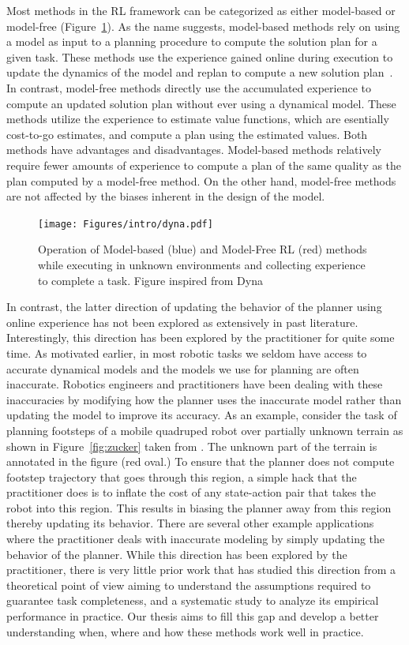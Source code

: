 Most methods in the RL framework can be categorized as either model-based
or model-free (Figure~\ref{fig:dyna}). As the name suggests, model-based methods rely on
using a model as input to a planning procedure to compute the solution
plan for a given task. These methods use the experience gained online
during execution to update the dynamics of the model and replan to
compute a new solution plan~\cite{DBLP:journals/sigart/Sutton91}. In
contrast, model-free methods directly 
use the accumulated experience to compute an updated solution plan
without ever using a dynamical model. These methods utilize the
experience to estimate value functions, which are esentially
cost-to-go estimates, and compute a plan using the estimated
values. Both methods have advantages and disadvantages. Model-based
methods relatively require fewer amounts of experience to compute a
plan of the same quality as the plan computed by a model-free
method. On the other hand, model-free methods are not affected by the biases
inherent in the design of the model.

\begin{figure}[t]
  \centering
  \texttt{[image: Figures/intro/dyna.pdf]}
  \caption{Operation of Model-based (blue) and Model-Free RL (red) methods
    while executing in unknown environments and collecting
    experience to complete a task. Figure inspired from Dyna~\cite{DBLP:journals/sigart/Sutton91}}
  \label{fig:dyna}
\end{figure}

In contrast, the latter direction of updating the behavior of the
planner using online experience has not been explored as extensively
in past literature. Interestingly, this direction has been explored by
the practitioner for quite some time. As motivated earlier, in most
robotic tasks we seldom have access to accurate dynamical models and
the models we use for planning are often inaccurate. Robotics
engineers and practitioners have been dealing with these inaccuracies
by modifying how the planner uses the inaccurate model rather than
updating the model to improve its accuracy. As an example, consider
the task of planning footsteps of a mobile quadruped robot over
partially unknown terrain as shown in Figure~\ref{fig:zucker} taken
from \cite{DBLP:journals/ijrr/ZuckerRSCBAK11}. The
unknown part of the terrain is annotated in the figure (red oval.) To
ensure that the planner does not compute footstep trajectory that goes
through this region, a simple
hack that the practitioner does is to inflate the cost of any
state-action pair that takes the robot into this region. This results
in biasing the planner away from this region thereby updating its
behavior. There are several other example applications where the
practitioner deals with inaccurate modeling by simply updating the
behavior of the planner. While this direction has been explored by the
practitioner, there is very little prior work that has studied this
direction from a theoretical point of view aiming to understand the
assumptions required to guarantee task completeness, and a systematic
study to analyze its empirical performance in practice. Our thesis
aims to fill this gap and develop a better understanding when, where
and how these methods work well in practice.

